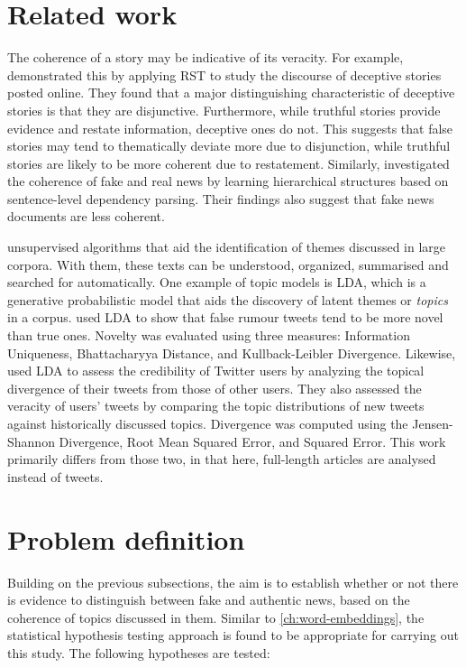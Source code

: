 \section{Related work}
\label{sec:4-related-work}

The coherence of a story may be indicative of its veracity. For example,  demonstrated this by applying \ac{RST} to study the discourse of deceptive stories posted online. They found that a major distinguishing characteristic of deceptive stories is that they are disjunctive. Furthermore, while truthful stories provide evidence and restate information, deceptive ones do not. This suggests that false stories may tend to thematically deviate more due to disjunction, while truthful stories are likely to be more coherent due to restatement. Similarly,  investigated the coherence of fake and real news by learning hierarchical structures based on sentence-level dependency parsing. Their findings also suggest that fake news documents are less coherent.

 unsupervised algorithms that aid the identification of themes discussed in large corpora. With them, these texts can be understood, organized, summarised and searched for automatically. One example of topic models is \ac{LDA}, which is a generative probabilistic model that aids the discovery of latent themes or \emph{topics} in a corpus.  used \ac{LDA} to show that false rumour tweets tend to be more novel than true ones. Novelty was evaluated using three measures: Information Uniqueness, Bhattacharyya Distance, and Kullback-Leibler Divergence. Likewise,  used \ac{LDA} to assess the credibility of Twitter users by analyzing the topical divergence of their tweets from those of other users. They also assessed the veracity of users’ tweets by comparing the topic distributions of new tweets against historically discussed topics. Divergence was computed using the Jensen-Shannon Divergence, Root Mean Squared Error, and Squared Error. This work primarily differs from those two, in that here, full-length articles are analysed instead of tweets.

\section{Problem definition}
\label{sec:4-problem}

Building on the previous subsections, the aim is to establish whether or not there is evidence to distinguish between fake and authentic news, based on the coherence of topics discussed in them. Similar to \autoref{ch:word-embeddings}, the statistical hypothesis testing approach is found to be appropriate for carrying out this study. The following hypotheses are tested:

